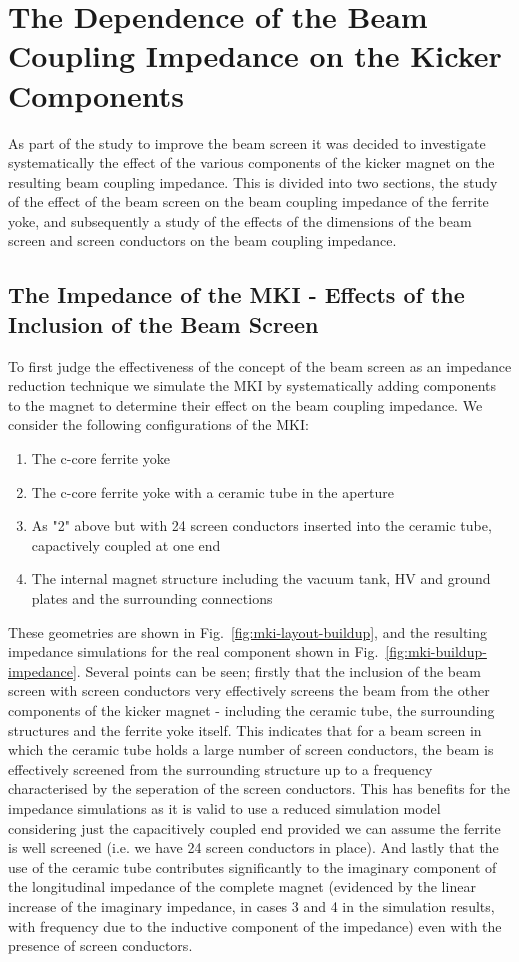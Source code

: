 \section{The Dependence of the Beam Coupling Impedance on the Kicker Components}

As part of the study to improve the beam screen it was decided to investigate systematically the effect of the various components of the kicker magnet on the resulting beam coupling impedance. This is divided into two sections, the study of the effect of the beam screen on the beam coupling impedance of the ferrite yoke, and subsequently a study of the effects of the dimensions of the beam screen and screen conductors on the beam coupling impedance.

\subsection{The Impedance of the MKI - Effects of the Inclusion of the Beam Screen}

To first judge the effectiveness of the concept of the beam screen as an impedance reduction technique we simulate the MKI by systematically adding components to the magnet to determine their effect on the beam coupling impedance. We consider the following configurations of the MKI:

\begin{enumerate}
\item{The c-core ferrite yoke}
\item{The c-core ferrite yoke with a ceramic tube in the aperture}
\item{As "2" above but with 24 screen conductors inserted into the ceramic tube, capactively coupled at one end}
\item{The internal magnet structure including the vacuum tank, HV and ground plates and the surrounding connections}
\end{enumerate}

These geometries are shown in Fig.~\ref{fig:mki-layout-buildup}, and the resulting impedance simulations for the real component shown in Fig.~\ref{fig:mki-buildup-impedance}. Several points can be seen; firstly that the inclusion of the beam screen with screen conductors very effectively screens the beam from the other components of the kicker magnet - including the ceramic tube, the surrounding structures and the ferrite yoke itself. This indicates that for a beam screen in which the ceramic tube holds a large number of screen conductors, the beam is effectively screened from the surrounding structure up to a frequency characterised by the seperation of the screen conductors. This has benefits for the impedance simulations as it is valid to use a reduced simulation model considering just the capacitively coupled end provided we can assume the ferrite is well screened (i.e. we have 24 screen conductors in place). And lastly that the use of the ceramic tube contributes significantly to the imaginary component of the longitudinal impedance of the complete magnet (evidenced by the linear increase of the imaginary impedance, in cases 3 and 4 in the simulation results, with frequency due to the inductive component of the impedance) even with the presence of screen conductors.
 
